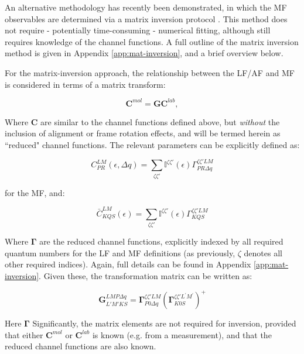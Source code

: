 An alternative methodology has recently been demonstrated, in which the MF observables are determined via a matrix inversion protocol \cite{gregory2021MolecularFramePhotoelectron}. This method does not require - potentially time-consuming - numerical fitting, although still requires knowledge of the channel functions. A full outline of the matrix inversion method is given in Appendix \ref{app:mat-inversion}, and a brief overview below.

For the matrix-inversion approach, the relationship between the LF/AF and MF is considered in terms of a matrix transform:

\begin{equation}
\mathbf{C}^{mol}=\mathbf{G}\mathbf{C}^{lab},\label{eq:basic}
\end{equation}

Where $\mathbf{C}$ are similar to the channel functions defined above, but \textit{without} the inclusion of alignment or frame rotation effects, and will be termed herein as ``reduced" channel functions. The relevant parameters can be explicitly defined as:

\begin{equation}
C_{PR}^{LM}(\epsilon,\Delta q)=\sum_{\zeta\zeta'}\mathbb{I}^{\zeta\zeta'}(\epsilon)\Gamma_{PR\Delta q}^{\zeta\zeta'LM}
\end{equation}

for the MF, and:

\begin{equation}
\bar{C}_{KQS}^{LM}(\epsilon)=\sum_{\zeta\zeta'}\mathbb{I}^{\zeta\zeta'}(\epsilon)\Gamma_{KQS}^{\zeta\zeta'LM}
\end{equation}

Where $\mathbf{\Gamma}$ are the reduced channel functions, explicitly indexed by all required quantum numbers for the LF and MF definitions (as previously, $\zeta$ denotes all other required indices). Again, full details can be found in Appendix \ref{app:mat-inversion}. Given these, the transformation matrix can be written as:

\begin{equation}
\mathbf{G}_{L'M'KS}^{LMP\Delta q}=\mathbf{\Gamma}_{P0\Delta q}^{\zeta\zeta'LM}(\mathbf{\Gamma}_{K0S}^{\zeta\zeta'L^{\prime}M^{\prime}})^{+}
\end{equation}

Here $\mathbf{\Gamma}$ Significantly, the matrix elements are not required for inversion, provided that either $\mathbf{C}^{mol}$ or $\mathbf{C}^{lab}$ is known (e.g. from a measurement), and that the reduced channel functions are also known.


